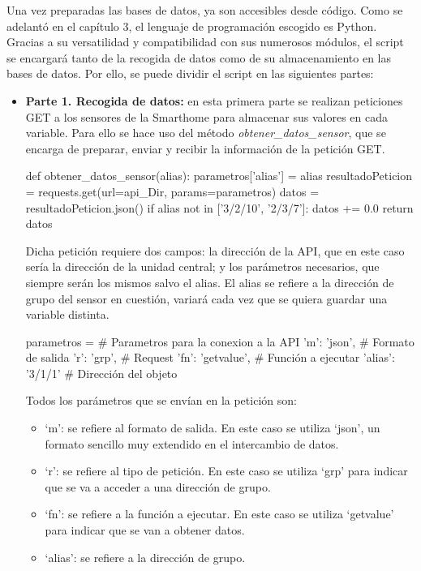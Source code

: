 Una vez preparadas las bases de datos, ya son accesibles desde código. Como se adelantó en el capítulo 3, el lenguaje de programación escogido es Python. Gracias a su versatilidad y compatibilidad con sus numerosos módulos, el script se encargará tanto de la recogida de datos como de su almacenamiento en las bases de datos. Por ello, se puede dividir el script en las siguientes partes:

\begin{itemize}
    \item \textbf{Parte 1. Recogida de datos:} en esta primera parte se realizan peticiones GET a los sensores de la Smarthome para almacenar sus valores en cada variable. Para ello se hace uso del método \textit{obtener\_datos\_sensor}, que se encarga de preparar, enviar y recibir la información de la petición GET.
    
    \begin{python}
    def obtener_datos_sensor(alias):
        parametros['alias'] = alias
        resultadoPeticion = requests.get(url=api_Dir, params=parametros)
        datos = resultadoPeticion.json()
        if alias not in ['3/2/10', '2/3/7']:
            datos += 0.0
        return datos
    \end{python}
    
    Dicha petición requiere dos campos: la dirección de la API, que en este caso sería la dirección de la unidad central; y los parámetros necesarios, que siempre serán los mismos salvo el alias. El alias se refiere a la dirección de grupo del sensor en cuestión, variará cada vez que se quiera guardar una variable distinta.
    
    \begin{python}
    parametros = { # Parametros para la conexion a la API
        'm': 'json', # Formato de salida
        'r': 'grp', # Request
        'fn': 'getvalue', # Función a ejecutar
        'alias': '3/1/1' # Dirección del objeto
    }
    \end{python}

    Todos los parámetros que se envían en la petición son:

    \begin{itemize}
        \item ‘m’: se refiere al formato de salida. En este caso se utiliza ‘json’, un formato sencillo muy extendido en el intercambio de datos.
        \item ‘r’: se refiere al tipo de petición. En este caso se utiliza ‘grp’ para indicar que se va a acceder a una dirección de grupo.
        \item ‘fn’: se refiere a la función a ejecutar. En este caso se utiliza ‘getvalue’ para indicar que se van a obtener datos.
        \item‘alias’: se refiere a la dirección de grupo.
    \end{itemize}


\end{itemize}
